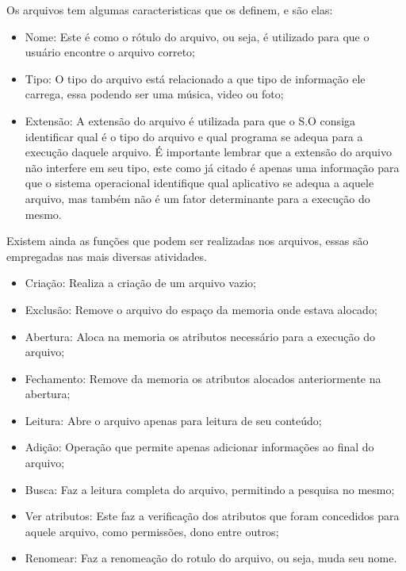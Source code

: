 \documentclass[
	12pt,				%
	openright,			%
	twoside,			%
	a4paper,			%
	chapter=TITLE,		%
	section=TITLE,		%
	english,	
	brazil				%
]{abntex2}
\begin{document}
Os arquivos tem algumas caracteristicas que os definem, e são elas:

\begin{itemize}

\item Nome: Este é como o rótulo do arquivo, ou seja, é utilizado para que o usuário encontre o arquivo correto;
\item Tipo: O tipo do arquivo está relacionado a que tipo de informação ele carrega, essa podendo ser uma música, video ou foto;
\item Extensão: A extensão do arquivo é utilizada para que o S.O consiga identificar qual é o tipo do arquivo e qual programa se adequa para a execução daquele arquivo. É importante lembrar que a extensão do arquivo não interfere em seu tipo, este como já citado é apenas uma informação para que o sistema operacional identifique qual aplicativo se adequa a aquele arquivo, mas também não é um fator determinante para a execução do mesmo.

\end{itemize}

Existem ainda as funções que podem ser realizadas nos arquivos, essas são empregadas nas mais diversas atividades.

\begin{itemize}

\item Criação: Realiza a criação de um arquivo vazio;
\item Exclusão: Remove o arquivo do espaço da memoria onde estava alocado;
\item Abertura: Aloca na memoria os atributos necessário para a execução do arquivo;
\item Fechamento: Remove da memoria os atributos alocados anteriormente na abertura;
\item Leitura: Abre o arquivo apenas para leitura de seu conteúdo;
\item Adição: Operação que permite apenas adicionar informações ao final do arquivo;
\item Busca: Faz a leitura completa do arquivo, permitindo a pesquisa no mesmo;
\item Ver atributos: Este faz a verificação dos atributos que foram concedidos para aquele arquivo, como permissões, dono entre outros;
\item Renomear: Faz a renomeação do rotulo do arquivo, ou seja, muda seu nome.

\end{itemize}
\end{document}
